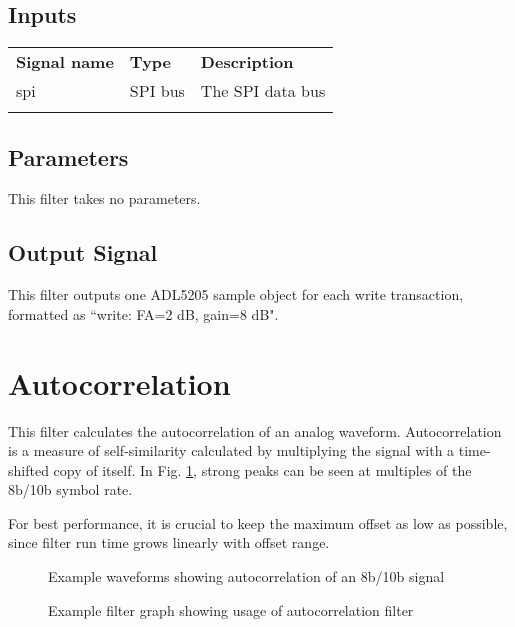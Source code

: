 \subsection{Inputs}

\begin{tabularx}{16cm}{llX}
\thickhline
\textbf{Signal name} & \textbf{Type} & \textbf{Description} \\
\thickhline
spi & SPI bus & The SPI data bus \\
\thickhline
\end{tabularx}

\subsection{Parameters}

This filter takes no parameters.

\subsection{Output Signal}

This filter outputs one ADL5205 sample object for each write transaction, formatted as ``write: FA=2 dB, gain=8 dB".

\pagebreak
\section{Autocorrelation}
\label{filter:autocorrelation}

This filter calculates the autocorrelation of an analog waveform. Autocorrelation is a measure of self-similarity
calculated by multiplying the signal with a time-shifted copy of itself. In Fig. \ref{filter_autocorrelation}, strong peaks
can be seen at multiples of the 8b/10b symbol rate.

For best performance, it is crucial to keep the maximum offset as low as possible, since filter run time grows linearly
with offset range.

\begin{figure}[h]
\centering
{}
\caption{Example waveforms showing autocorrelation of an 8b/10b signal}
\label{filter_autocorrelation}
\end{figure}

\begin{figure}[h]
\centering
{}
\caption{Example filter graph showing usage of autocorrelation filter}
\label{filter_graph_autocorrelation}
\end{figure}
\FloatBarrier

